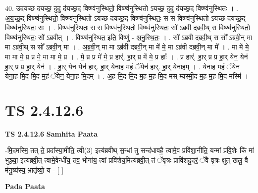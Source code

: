 \documentclass[17pt]{extarticle}
\begin{document}
40. उद॑यच्छ दयच्छ॒ दुदु द॑यच्छ॒द् विष्ण्व॑नुस्थितो॒ विष्ण्व॑नुस्थितो ऽयच्छ॒ दुदु द॑यच्छ॒द् विष्ण्व॑नुस्थितः । . अ॒य॒च्छ॒द् विष्ण्व॑नुस्थितो॒ विष्ण्व॑नुस्थितो ऽयच्छ दयच्छ॒द् विष्ण्व॑नुस्थितः॒ स स विष्ण्व॑नुस्थितो ऽयच्छ दयच्छ॒द् विष्ण्व॑नुस्थितः॒ सः । . विष्ण्व॑नुस्थितः॒ स स विष्ण्व॑नुस्थितो॒ विष्ण्व॑नुस्थितः॒ सो᳚ ऽब्रवी दब्रवी॒थ् स विष्ण्व॑नुस्थितो॒ विष्ण्व॑नुस्थितः॒ सो᳚ ऽब्रवीत् । . विष्ण्व॑नुस्थित॒ इति॒ विष्णु॑ - अ॒नु॒स्थि॒तः॒ । . सो᳚ ऽब्रवी दब्रवी॒थ् स सो᳚ ऽब्रवी॒न् मा मा ऽब्र॑वी॒थ् स सो᳚ ऽब्रवी॒न् मा । . अ॒ब्र॒वी॒न् मा मा ऽब्र॑वी दब्रवी॒न् मा मे॑ मे॒ मा ऽब्र॑वी दब्रवी॒न् मा मे᳚ । . मा मे॑ मे॒ मा मा मे॒ प्र प्र मे॒ मा मा मे॒ प्र । . मे॒ प्र प्र मे॑ मे॒ प्र हार्॑. हा॒र् प्र मे॑ मे॒ प्र हाः᳚ । . प्र हार्॑. हा॒र् प्र प्र हा॒र् येन॒ येन॑ हा॒र् प्र प्र हा॒र् येन॑ । . हा॒र् येन॒ येन॑ हार्. हा॒र् येना॒ह म॒हं ॅयेन॑ हार्. हा॒र् येना॒हम् । . येना॒ह म॒हं ॅयेन॒ येना॒ह मि॒द मि॒द म॒हं ॅयेन॒ येना॒ह मि॒दम् । . अ॒ह मि॒द मि॒द म॒ह म॒ह मि॒द मस् म्यस्मी॒द म॒ह म॒ह मि॒द मस्मि॑ । \newline
\pagebreak
{}

\section{ TS 2.4.12.6 }

\textbf{TS 2.4.12.6 } \newline
\textbf{Samhita Paata} \newline

-मि॒दमस्मि॒ तत् ते॒ प्रदा᳚स्या॒मीति॒ त्वी(3) इत्य॑ब्रवीथ् स॒न्धां तु सन्द॑धावहै॒ त्वामे॒व प्रवि॑शा॒नीति॒ यन्मां प्र॑वि॒शेः किं मा॑ भुञ्ज्या॒ इत्य॑ब्रवी॒त् त्वामे॒वेन्धी॑य॒ तव॒ भोगा॑य॒ त्वां प्रवि॑शेय॒मित्य॑ब्रवी॒त् तं ॅवृ॒त्रः प्रावि॑शदु॒दरं॒ ॅवै वृ॒त्रः क्षुत् खलु॒ वै म॑नु॒ष्य॑स्य॒ भ्रातृ॑व्यो॒ य - [  ] \newline

\textbf{Pada Paata} \newline
\end{document}
